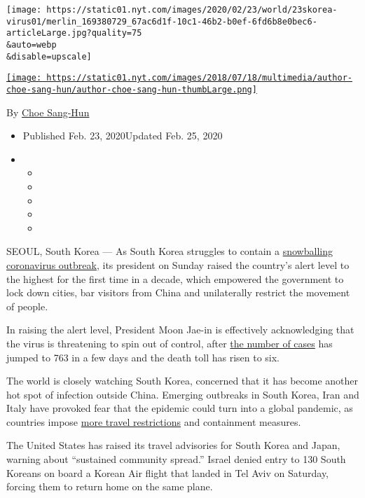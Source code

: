 \texttt{[image: https://static01.nyt.com/images/2020/02/23/world/23skorea-virus01/merlin\_169380729\_67ac6d1f-10c1-46b2-b0ef-6fd6b8e0bec6-articleLarge.jpg?quality=75\\\&auto=webp\\\&disable=upscale]}

\href{https://www.nytimes.com/by/choe-sang-hun}{\texttt{[image: https://static01.nyt.com/images/2018/07/18/multimedia/author-choe-sang-hun/author-choe-sang-hun-thumbLarge.png]}}

By \href{https://www.nytimes.com/by/choe-sang-hun}{Choe Sang-Hun}

\begin{itemize}
\item
  Published Feb. 23, 2020Updated Feb. 25, 2020
\item
  \begin{itemize}
  \item
  \item
  \item
  \item
  \item
  \end{itemize}
\end{itemize}

SEOUL, South Korea --- As South Korea struggles to contain a
\href{http://www.nytimes.com/2020/02/25/world/asia/daegu-south-korea-coronavirus.html}{snowballing
coronavirus outbreak}, its president on Sunday raised the country's
alert level to the highest for the first time in a decade, which
empowered the government to lock down cities, bar visitors from China
and unilaterally restrict the movement of people.

In raising the alert level, President Moon Jae-in is effectively
acknowledging that the virus is threatening to spin out of control,
after
\href{https://www.nytimes.com/interactive/2020/world/asia/china-wuhan-coronavirus-maps.html}{the
number of cases} has jumped to 763 in a few days and the death toll has
risen to six.

The world is closely watching South Korea, concerned that it has become
another hot spot of infection outside China. Emerging outbreaks in South
Korea, Iran and Italy have provoked fear that the epidemic could turn
into a global pandemic, as countries impose
\href{https://www.nytimes.com/interactive/2020/02/21/business/coronavirus-airline-travel.html}{more
travel restrictions} and containment measures.

The United States has raised its travel advisories for South Korea and
Japan, warning about ``sustained community spread.'' Israel denied entry
to 130 South Koreans on board a Korean Air flight that landed in Tel
Aviv on Saturday, forcing them to return home on the same plane.

